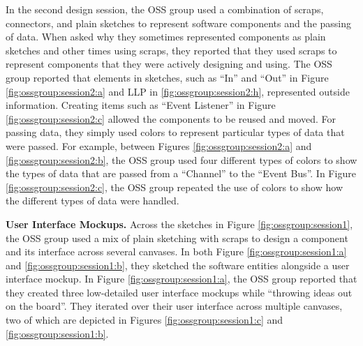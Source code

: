In the second design session, the OSS group used a combination of scraps, connectors, and plain sketches to represent software components and the passing of data. When asked why they sometimes represented components as plain sketches and other times using scraps, they reported that they used scraps to represent components that they were actively designing and using. The OSS group reported that elements in sketches, such as ``In'' and ``Out'' in Figure \ref{fig:ossgroup:session2:a} and LLP in \ref{fig:ossgroup:session2:h}, represented outside information. Creating items such as ``Event Listener'' in Figure \ref{fig:ossgroup:session2:c} allowed the components to be reused and moved. For passing data, they simply used colors to represent particular types of data that were passed. For example, between Figures \ref{fig:ossgroup:session2:a} and \ref{fig:ossgroup:session2:b}, the OSS group used four different types of colors to show the types of data that are passed from a ``Channel'' to the ``Event Bus''. In Figure \ref{fig:ossgroup:session2:c}, the OSS group repeated the use of colors to show how the different types of data were handled.

\textbf{User Interface Mockups. } Across the sketches in Figure \ref{fig:ossgroup:session1}, the OSS group used a mix of plain sketching with scraps to design a component and its interface across several canvases. In both Figure \ref{fig:ossgroup:session1:a} and \ref{fig:ossgroup:session1:b}, they sketched the software entities alongside a user interface mockup. In Figure \ref{fig:ossgroup:session1:a}, the OSS group reported that they created three low-detailed user interface mockups while ``throwing ideas out on the board''. They iterated over their user interface across multiple canvases, two of which are depicted in Figures \ref{fig:ossgroup:session1:c} and \ref{fig:ossgroup:session1:b}.


